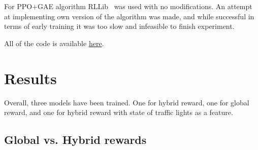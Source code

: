 \documentclass{article}
\begin{document}
    For PPO+GAE algorithm RLLib~\cite{rllib} was used with no modifications.
    An attempt at implementing own version of the algorithm was made, and while successful in terms of early training it was too slow and infeasible to finish experiment.

    All of the code is available \href{https://github.com/balbok0/utc-reproduction}{here}.

    \section{Results}
    Overall, three models have been trained.
    One for hybrid reward, one for global reward, and one for hybrid reward with state of traffic lights as a feature.

    \subsection{Global vs. Hybrid rewards}
\end{document}
